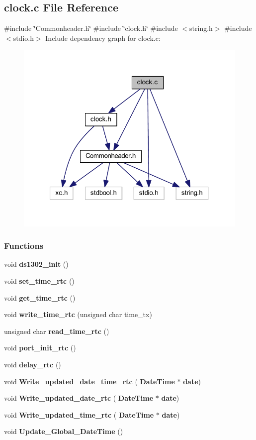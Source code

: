\subsection{clock.\+c File Reference}
\label{a00014}
{\ttfamily \#include \char`\"{}Commonheader.\+h\char`\"{}}\newline
{\ttfamily \#include \char`\"{}clock.\+h\char`\"{}}\newline
{\ttfamily \#include $<$string.\+h$>$}\newline
{\ttfamily \#include $<$stdio.\+h$>$}\newline
Include dependency graph for clock.\+c\+:
\nopagebreak
\begin{figure}[H]
\begin{center}
\leavevmode
\includegraphics[width=321pt]{a00015}
\end{center}
\end{figure}
\subsubsection*{Functions}
\begin{DoxyCompactItemize}
\item 
void \textbf{ ds1302\+\_\+init} ()
\item 
void \textbf{ set\+\_\+time\+\_\+rtc} ()
\item 
void \textbf{ get\+\_\+time\+\_\+rtc} ()
\item 
void \textbf{ write\+\_\+time\+\_\+rtc} (unsigned char time\+\_\+tx)
\item 
unsigned char \textbf{ read\+\_\+time\+\_\+rtc} ()
\item 
void \textbf{ port\+\_\+init\+\_\+rtc} ()
\item 
void \textbf{ delay\+\_\+rtc} ()
\item 
void \textbf{ Write\+\_\+updated\+\_\+date\+\_\+time\+\_\+rtc} (\textbf{ Date\+Time} $\ast$\textbf{ date})
\item 
void \textbf{ Write\+\_\+updated\+\_\+date\+\_\+rtc} (\textbf{ Date\+Time} $\ast$\textbf{ date})
\item 
void \textbf{ Write\+\_\+updated\+\_\+time\+\_\+rtc} (\textbf{ Date\+Time} $\ast$\textbf{ date})
\item 
void \textbf{ Update\+\_\+\+Global\+\_\+\+Date\+Time} ()
\end{DoxyCompactItemize}


